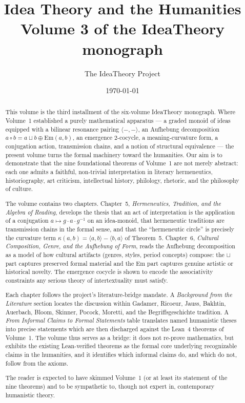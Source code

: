 \documentclass[11pt,oneside]{book}
\title{Idea Theory and the Humanities\\
\large Volume 3 of the IdeaTheory monograph}
\author{The IdeaTheory Project}
\date{\today}
\begin{document}
\frontmatter
\maketitle

\begin{abstract}
This volume is the third installment of the six-volume IdeaTheory
monograph. Where Volume~1 established a purely mathematical apparatus
--- a graded monoid of ideas equipped with a bilinear resonance pairing
$\langle-,-\rangle$, an Aufhebung decomposition $a\circ b = a\sqcup b
\oplus \mathrm{Em}(a,b)$, an emergence $2$-cocycle, a meaning-curvature
form, a conjugation action, transmission chains, and a notion of
structural equivalence --- the present volume turns the formal
machinery toward the humanities. Our aim is to demonstrate that the
nine foundational theorems of Volume~1 are not merely abstract: each
one admits a faithful, non-trivial interpretation in literary
hermeneutics, historiography, art criticism, intellectual history,
philology, rhetoric, and the philosophy of culture.

The volume contains two chapters. Chapter~5, \emph{Hermeneutics,
Tradition, and the Algebra of Reading}, develops the thesis that an
act of interpretation is the application of a conjugation $a\mapsto
g\cdot a\cdot g^{-1}$ on an idea-monoid, that hermeneutic traditions
are transmission chains in the formal sense, and that the
``hermeneutic circle'' is precisely the curvature term
$\kappa(a,b)=\langle a,b\rangle - \langle b,a\rangle$ of Theorem~5.
Chapter~6, \emph{Cultural Composition, Genre, and the Aufhebung of
Form}, reads the Aufhebung decomposition as a model of how cultural
artifacts (genres, styles, period concepts) compose: the $\sqcup$ part
captures preserved formal material and the $\mathrm{Em}$ part captures
genuine artistic or historical novelty. The emergence cocycle is shown
to encode the associativity constraints any serious theory of
intertextuality must satisfy.

Each chapter follows the project's literature-bridge mandate. A
\emph{Background from the Literature} section locates the discussion
within Gadamer, Ricoeur, Jauss, Bakhtin, Auerbach, Bloom, Skinner,
Pocock, Moretti, and the Begriffsgeschichte tradition. A
\emph{From Informal Claims to Formal Statements} table translates
named humanistic theses into precise statements which are then
discharged against the Lean~4 theorems of Volume~1. The volume thus
serves as a bridge: it does not re-prove mathematics, but exhibits
the existing Lean-verified theorems as the formal core underlying
recognizable claims in the humanities, and it identifies which
informal claims do, and which do not, follow from the axioms.

The reader is expected to have skimmed Volume~1 (or at least its
statement of the nine theorems) and to be sympathetic to, though not
expert in, contemporary humanistic theory.
\end{abstract}
\end{document}
